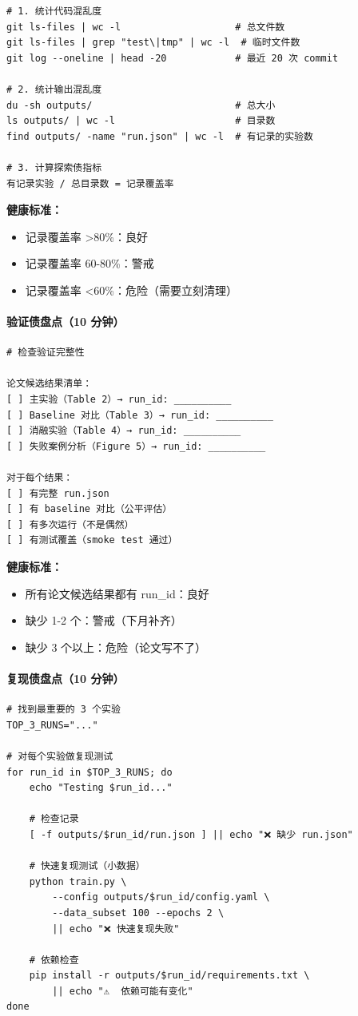 \begin{verbatim}
# 1. 统计代码混乱度
git ls-files | wc -l                    # 总文件数
git ls-files | grep "test\|tmp" | wc -l  # 临时文件数
git log --oneline | head -20            # 最近 20 次 commit

# 2. 统计输出混乱度
du -sh outputs/                         # 总大小
ls outputs/ | wc -l                     # 目录数
find outputs/ -name "run.json" | wc -l  # 有记录的实验数

# 3. 计算探索债指标
有记录实验 / 总目录数 = 记录覆盖率
\end{verbatim}

\textbf{健康标准：}
\begin{itemize}
  \item 记录覆盖率 >80\%：良好
  \item 记录覆盖率 60-80\%：警戒
  \item 记录覆盖率 <60\%：危险（需要立刻清理）
\end{itemize}

\paragraph{验证债盘点（10 分钟）}

\begin{verbatim}
# 检查验证完整性

论文候选结果清单：
[ ] 主实验（Table 2）→ run_id: __________
[ ] Baseline 对比（Table 3）→ run_id: __________
[ ] 消融实验（Table 4）→ run_id: __________
[ ] 失败案例分析（Figure 5）→ run_id: __________

对于每个结果：
[ ] 有完整 run.json
[ ] 有 baseline 对比（公平评估）
[ ] 有多次运行（不是偶然）
[ ] 有测试覆盖（smoke test 通过）
\end{verbatim}

\textbf{健康标准：}
\begin{itemize}
  \item 所有论文候选结果都有 run\_id：良好
  \item 缺少 1-2 个：警戒（下月补齐）
  \item 缺少 3 个以上：危险（论文写不了）
\end{itemize}

\paragraph{复现债盘点（10 分钟）}

\begin{verbatim}
# 找到最重要的 3 个实验
TOP_3_RUNS="..."

# 对每个实验做复现测试
for run_id in $TOP_3_RUNS; do
    echo "Testing $run_id..."

    # 检查记录
    [ -f outputs/$run_id/run.json ] || echo "❌ 缺少 run.json"

    # 快速复现测试（小数据）
    python train.py \
        --config outputs/$run_id/config.yaml \
        --data_subset 100 --epochs 2 \
        || echo "❌ 快速复现失败"

    # 依赖检查
    pip install -r outputs/$run_id/requirements.txt \
        || echo "⚠️  依赖可能有变化"
done
\end{verbatim}

